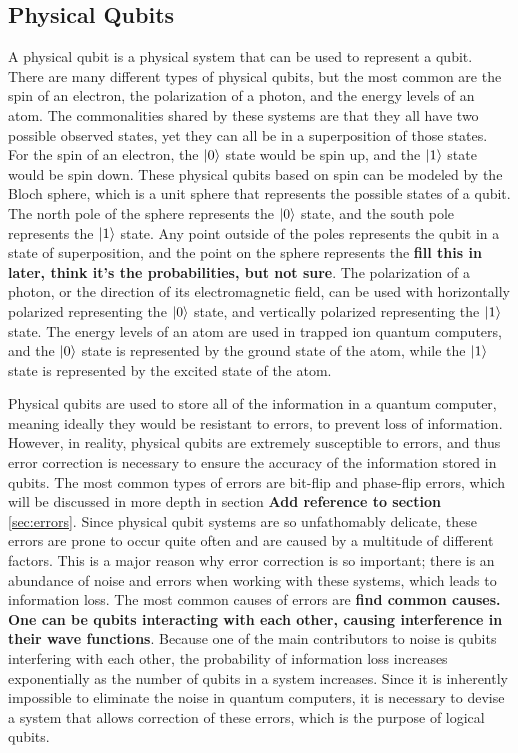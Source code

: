 \documentclass{article}
\begin{document}
\subsection{Physical Qubits}
\label{sec:physicalqubits}
A physical qubit is a physical system that can be used to represent a qubit. There are many different types of physical qubits, but the most common are the spin of an electron,
the polarization of a photon, and the energy levels of an atom. The commonalities shared by these systems are that they all have two possible observed states, yet they can all
be in a superposition of those states. For the spin of an electron, the $\ket{0}$ state would be spin up, and the $\ket{1}$ state would be spin down. These physical qubits based 
on spin can be modeled by the Bloch sphere, which is a unit sphere that represents the possible states of a qubit. The north pole of the sphere represents the $\ket{0}$ state,
and the south pole represents the $\ket{1}$ state. Any point outside of the poles represents the qubit in a state of superposition, and the point on the sphere represents the
\textbf{fill this in later, think it's the probabilities, but not sure}. The polarization of a photon, or the direction of its electromagnetic field, can be used with 
horizontally polarized representing the $\ket{0}$ state, and vertically polarized representing the $\ket{1}$ state. The energy levels of an atom are used in trapped ion 
quantum computers, and the $\ket{0}$ state is represented by the ground state of the atom, while the $\ket{1}$ state is represented by the excited state of the atom.

\vspace{5mm}

Physical qubits are used to store all of the information in a quantum computer, meaning ideally they would be resistant to errors, to prevent loss of information. However, in 
reality, physical qubits are extremely susceptible to errors, and thus error correction is necessary to ensure the accuracy of the information stored in qubits. The most 
common types of errors are bit-flip and phase-flip errors, which will be discussed in more depth in section \textbf{Add reference to section} \ref{sec:errors}. Since physical
qubit systems are so unfathomably delicate, these errors are prone to occur quite often and are caused by a multitude of different factors. This is a major reason why error 
correction is so important; there is an abundance of noise and errors when working with these systems, which leads to information loss. The most common causes of
errors are \textbf{find common causes. One can be qubits interacting with each other, causing interference in their wave functions}. Because one of the main contributors to 
noise is qubits interfering with each other, the probability of information loss increases exponentially as the number of qubits in a system increases. Since it is inherently 
impossible to eliminate the noise in quantum computers, it is necessary to devise a system that allows correction of these errors, which is the purpose of logical qubits.
\end{document}
